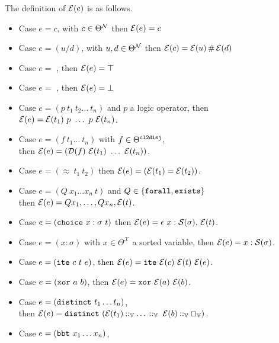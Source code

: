 \begin{definition}
The definition of $\E{e}$ is as follows.
\begin{itemize}
\setlength{\parskip}{0pt}
\item Case $e = c$, with $c \in \Theta^\cal{N}$ then $\E{e} = c$
\item Case $e = (u \slash d)$, with $u,d \in \Theta^\cal{N}$ then $\E{c} = \E{u} \,\#\, \E{d}$
\item Case $e =$ , then $\E{e} = \top$
\item Case $e =$ , then $\E{e} = \bot$
\item Case $e = (p~t_1~t_2\dots~t_n)$ and $p$ a logic operator, then $\E{e} = \E{t_1}~p~\dots~p~\E{t_n}$.
\item Case $e = (f~t_1\dots~t_n)$ with $f \in \Theta^\cltodisj$,\\
  then $\E{e} = (\mathcal{D}(f)~\E{t_1}~\dots~\E{t_n})$.
\item Case $e = (\approx~t_1~t_2)$ then $\E{e} = (\E{t_1} = \E{t_2})$.
\item Case $e = (Q~x_1  \dots x_n ~t)$ and $Q\in \{\kw{forall}, \kw{exists}\}$\\
  then $\E{e} = Q x_1, \dots, Q x_n, \E{t}$.
\item Case $e = (\kw{choice}~x : \sigma ~t)$ then $\E{e} = \epsilon~x: \cal{S}(\sigma),\, \E{t}$.
\item Case $e = (x: \sigma )$ with $x \in \Theta^\mathcal{X}$ a sorted variable, then $\E{e} = x: \cal{S}(\sigma)$.
\item Case $e = (\kw{ite}~c~t~e)$, then $\E{e} = \kw{ite}~\E{c}~\E{t}~\E{e}$.
\item Case $e = (\kw{xor}~a~b)$, then $\E{e} = \kw{xor}~\E{a}~\E{b}$.
\item Case $e = (\kw{distinct}~t_1 \dots t_n)$,\\
  then $\E{e} = \kw{distinct}~(\E{t_1} \mathbin{\cons_\bb{V}} \dots\, \mathbin{\cons_\bb{V}} ~\E{b} \mathbin{\cons_\bb{V}} \Box_\bb{V})$.
\item Case $e = (\kw{bbt}~x_1 \dots x_n)$, 
\end{itemize}
\label{def:function-e}
\end{definition}


